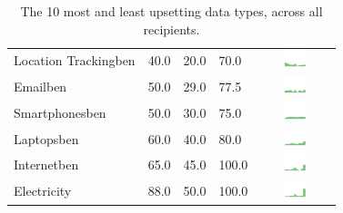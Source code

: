 \begin{table}[t]
\begin{center}
\begin{tabular}{| p{2cm} | p{1cm} | p{1cm} | p{1cm} | c |}
Location Trackingben & 40.0 & 20.0 & 70.0 & \includegraphics[width = 2cm, height = 0.5cm]{tables/locationtrackingben} \\ 
Emailben & 50.0 & 29.0 & 77.5 & \includegraphics[width = 2cm, height = 0.5cm]{tables/emailben} \\ 
Smartphonesben & 50.0 & 30.0 & 75.0 & \includegraphics[width = 2cm, height = 0.5cm]{tables/smartphonesben} \\ 
Laptopsben & 60.0 & 40.0 & 80.0 & \includegraphics[width = 2cm, height = 0.5cm]{tables/laptopsben} \\ 
Internetben & 65.0 & 45.0 & 100.0 & \includegraphics[width = 2cm, height = 0.5cm]{tables/internetben} \\ 
Electricity & 88.0 & 50.0 & 100.0 & \includegraphics[width = 2cm, height = 0.5cm]{tables/ElectricityBenefit} \\ 
\hline
\end{tabular}
\caption{The 10 most and least upsetting data types, across all recipients.}
\label{top10}
\end{center}
\end{table}

